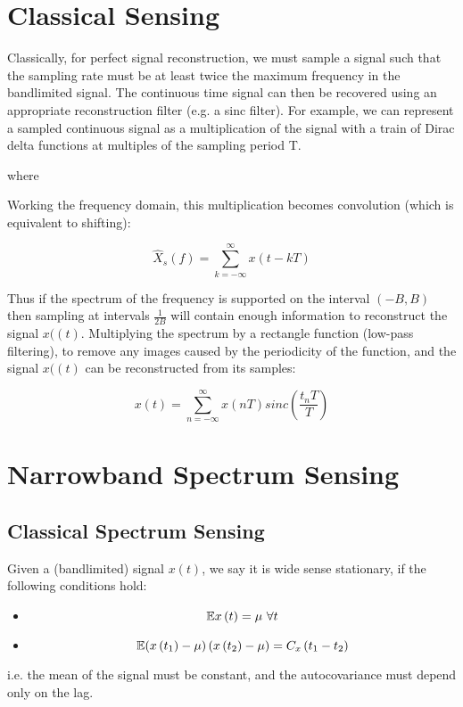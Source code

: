 \section{Classical Sensing}
Classically, for perfect signal reconstruction, we must sample a signal such that the sampling rate must be at least twice the maximum frequency in the bandlimited signal. The continuous time signal can then be recovered using an appropriate reconstruction filter (e.g. a sinc filter). For example, we can represent a sampled continuous signal as a multiplication of the signal with a train of Dirac delta functions at multiples of the sampling period T.
%

%
where
%


Working the frequency domain, this multiplication becomes convolution (which is equivalent to shifting):

\begin{equation}
\hat{X}_{s}\left(f\right) = \sum_{k=-\infty}^\infty x\left(t - kT\right)
\end{equation}

Thus if the spectrum of the frequency is supported on the interval \(\left(-B, B\right)\) then sampling at intervals \(\frac{1}{2B}\) will contain enough information to reconstruct the signal \(x(\left(t\right)\). Multiplying the spectrum by a rectangle function (low-pass filtering), to remove any images caused by the periodicity of the function, and the signal \(x(\left(t\right)\) can be reconstructed from its samples:

\begin{equation}
x\left(t\right) = \sum_{n=-\infty}^\infty x\left(nT\right) sinc\left(\frac{t_nT}{T}\right)
\end{equation}



\section{Narrowband Spectrum Sensing}

\subsection{Classical Spectrum Sensing}

\begin{definition}
Given a (bandlimited) signal \(x\left(t\right)\), we say it is wide sense stationary, if the following conditions hold:

\begin{itemize}
\item
\begin{equation}
{\mathbb{E}}{x\left(t\right)} = \mu \text{ } \forall t
\end{equation}
\item 
\begin{equation}
{\mathbb{E}}{\left(x\left(t_1\right) - \mu\right)\left(x\left(t_2\right) - \mu\right)} = C_{x}\left(t_1 - t_2 \right) 
\end{equation}
\end{itemize}
i.e. the mean of the signal must be constant, and the autocovariance must depend only on the lag.
\end{definition}

